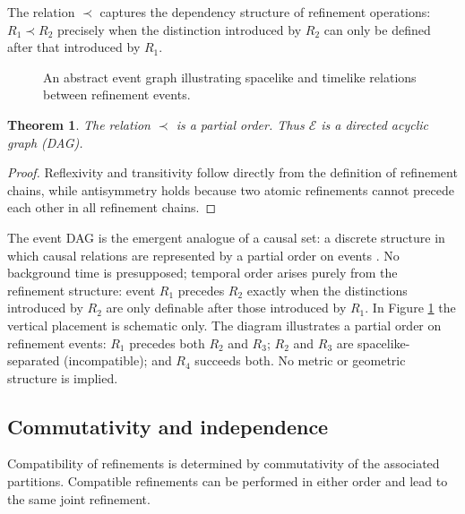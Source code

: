 \documentclass[
 amsmath,amssymb,
  onecolumn %
]{revtex4-2}
\newtheorem{theorem}{Theorem} [section]
\begin{document}
The relation $\prec$ captures the dependency structure of
refinement operations: $R_1\prec R_2$ precisely when the
distinction introduced by $R_2$ can only be defined after
that introduced by $R_1$.

\begin{figure}[htbp]
\centering
{}
\caption{An abstract event graph illustrating spacelike and timelike relations between refinement events.}
\label{fig:eventgraph}
\end{figure}

\begin{theorem} 
The relation $ \prec $ is a partial order. Thus $ \mathcal{E} $ is a directed acyclic graph (DAG).
\end{theorem} 
\begin{proof}
Reflexivity and transitivity follow directly from the definition
of refinement chains, while antisymmetry holds because two atomic
refinements cannot precede each other in all refinement chains.
\end{proof}

\noindent The event DAG is the emergent analogue of a causal set: a discrete
structure in which causal relations are represented by a partial
order on events \cite{BLS}. No background time is presupposed; temporal
order arises purely from the refinement structure: event $ R_1 $ precedes $ R_2 $ exactly when the distinctions introduced by $ R_2 $ are only definable after those introduced by $ R_1 $. In Figure \ref{fig:eventgraph} the vertical placement is schematic only. The diagram illustrates a partial order on refinement events: $R_1$ precedes both $R_2$ and $R_3$; $R_2$ and $R_3$ are spacelike-separated (incompatible); and $R_4$ succeeds both. No metric or geometric structure is implied. 

\subsection{Commutativity and independence}
Compatibility of refinements is determined by commutativity
of the associated partitions.
Compatible refinements can be performed in either order and
lead to the same joint refinement.
\end{document}
